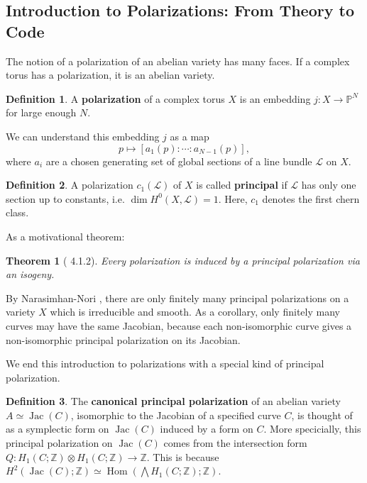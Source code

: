 \documentclass[12pt,reqno]{amsart}
\DeclareMathOperator{\Hom}{Hom}
\DeclareMathOperator{\Jac}{Jac}
\newcommand{\mc}{\mathcal}
\renewcommand{\P}{\mathbb{P}}
\newtheorem*{thm*}{Theorem}
\theoremstyle{definition}
\newtheorem{defn}{Definition}
\theoremstyle{remark}
\begin{document}
\subsection{Introduction to Polarizations: From Theory to Code}
\label{sec:intropol}
The notion of a polarization of an abelian variety has many faces. If a complex torus has a polarization, it is an abelian variety.

\begin{defn} A \textbf{polarization} of a complex torus $X$ is an embedding $j: X \to \P^N$ for large enough $N$. \end{defn}


We can understand this embedding $j$ as a map $$p \mapsto [a_1(p) : \cdots : a_{N-1}(p)],$$ where $a_i$ are a chosen generating set of global sections of a line bundle $\mc{L}$ on $X$. 

\begin{defn}  A polarization $c_1(\mc{L})$ of $X$ is called \textbf{principal} if $\mc{L}$ has only one section up to constants, i.e. $\dim H^0(X, \mc{L}) = 1$. Here, $c_1$ denotes the first chern class. \end{defn} 

As a motivational theorem:

\begin{thm*} [\cite{bl} 4.1.2] Every polarization is induced by a principal polarization via an isogeny. \end{thm*}

By Narasimhan-Nori \cite{nn}, there are only finitely many principal polarizations on a variety $X$ which is irreducible and smooth. As a corollary, only finitely many curves may have the same Jacobian, because each non-isomorphic curve gives a non-isomorphic principal polarization on its Jacobian.

\vspace{+5pt}
\noindent We end this introduction to polarizations with a special kind of principal polarization. 

\begin{defn} \label{canpp} The \textbf{canonical principal polarization} of an abelian variety $A \simeq \Jac(C)$, isomorphic to the Jacobian of a specified curve $C$, is thought of as a symplectic form on $\Jac(C)$ induced by a form on $C$. More specicially, this principal polarization on $\Jac(C)$ comes from the intersection form $Q: H_1(C; \mathbb{Z}) \otimes H_1(C; \mathbb{Z}) \to\mathbb{Z}$. This is because $H^2(\Jac(C); \mathbb{Z}) \simeq \Hom(\bigwedge H_1(C; \mathbb{Z}); \mathbb{Z})$. \end{defn}
\end{document}
